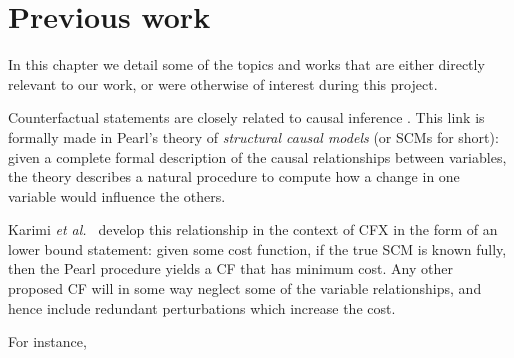 \documentclass[../main.tex]{subfiles}
\begin{document}
\chapter{Previous work}
\label{ch:previous_work}

In this chapter we detail some of the topics and works that are either directly relevant to our work, or were otherwise of interest during this project.



Counterfactual statements are closely related to causal inference \citenote.
This link is formally made in Pearl's theory of \emph{structural causal models} (or SCMs for short): given a complete formal description of the causal relationships between variables, the theory describes a natural procedure to compute how a change in one variable would influence the others. 

Karimi \textsl{et al.~} develop this relationship in the context of CFX in the form of an lower bound statement:
given some cost function, if the true SCM is known fully, then the Pearl procedure yields a CF that has minimum cost.
Any other proposed CF will in some way neglect some of the variable relationships, and hence include redundant perturbations which increase the cost.

For instance, 
\end{document}
